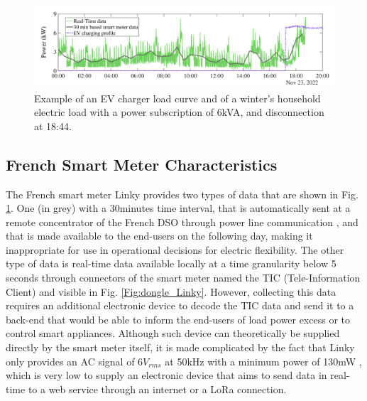 \documentclass[conference]{IEEEtran}
\begin{document}
	\begin{figure}[h]
		\centering
		\includegraphics[width=1\columnwidth]{Images/load_curvesEV.pdf}
		\caption{Example of an EV charger load curve and of a winter's household electric load with a power subscription of 6kVA, and disconnection at 18:44.} %
	\label{Fig:load_example}
\end{figure}

\subsection{French Smart Meter Characteristics}
The French smart meter Linky provides two types of data that are shown in Fig. \ref{Fig:load_example}. One (in grey) with a 30minutes time interval, that is automatically sent at a remote concentrator of the French DSO through power line communication \cite{IEEE:LinkyInfrastructure}, and that is made available 
 to the end-users on the following day,  making it inappropriate for use in operational decisions for electric flexibility. The other type of data is real-time data available locally at a time granularity below 5 seconds
   through connectors of the smart meter named the TIC (Tele-Information Client) and visible in Fig. \ref{Fig:dongle_Linky}. However, collecting this data requires an additional electronic device  to decode the TIC data  
	and send it to a back-end that would be able to inform the end-users of load power excess or to control smart appliances. 
	Although such device can theoretically be supplied directly by the smart meter itself, it is made complicated by the fact that 
	Linky only provides an AC signal of 6$V_{rms}$ at 50kHz with a minimum power of 130mW \cite{Enedis:Linkyspec}, which is very low to supply an electronic device that aims to send data in real-time to a web service through an internet or a LoRa connection. 
\end{document}
